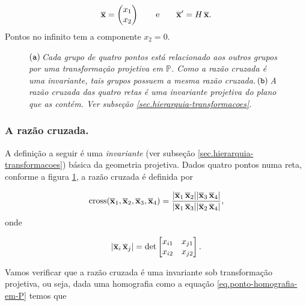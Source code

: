 \begin{equation}\label{eq.ponto-homografia-em-P}
\overline{\mathbf{x}}=
\begin{pmatrix}
x_1\\
x_2
\end{pmatrix}
\qquad\text{e}\qquad
\overline{\mathbf{x}}'=H\,\overline{\mathbf{x}}.
\end{equation}
Pontos no infinito tem a componente $x_2=0$.

\begin{figure}[!htb]
\centering
{}
\quad
{}
\caption{$({\tt a})\,$\textit{Cada grupo de quatro pontos está relacionado aos outros grupos por uma transformação projetiva em ${\mathbb{P}}$. Como a razão cruzada é uma invariante, tais grupos possuem a mesma razão cruzada.}$\,({\tt b})\,$\textit{A razão cruzada das quatro retas é uma invariante projetiva do plano que as contém. Ver subseção \ref{sec.hierarquia-transformacoes}.}}
\label{fig.razao-cruzada}
\end{figure}

\subsubsection*{A razão cruzada.}
A definição a seguir é uma \textit{invariante} (ver subseção \ref{sec.hierarquia-transformacoes}) básica da geometria projetiva. Dados quatro pontos numa reta, conforme a figura \ref{fig.razao-cruzada}, a razão cruzada é definida por 

\begin{equation*}
\text{cross}(\overline{\mathbf{x}}_1,\overline{\mathbf{x}}_2,\overline{\mathbf{x}}_3,\overline{\mathbf{x}}_4)=\frac{|\overline{\mathbf{x}}_1\,\overline{\mathbf{x}}_2||\overline{\mathbf{x}}_3\,\overline{\mathbf{x}}_4|}{|\overline{\mathbf{x}}_1\,\overline{\mathbf{x}}_3||\overline{\mathbf{x}}_2\,\overline{\mathbf{x}}_4|},
\end{equation*}
onde 

\begin{equation*}
|\overline{\mathbf{x}}_i\,\overline{\mathbf{x}}_j|=
\text{det}
\begin{bmatrix}
x_{i1}&x_{j1}\\
x_{i2}&x_{j2}
\end{bmatrix}.
\end{equation*}

Vamos verificar que a razão cruzada é uma invariante sob transformação projetiva, ou seja, dada uma homografia como a equação \ref{eq.ponto-homografia-em-P} temos que 

